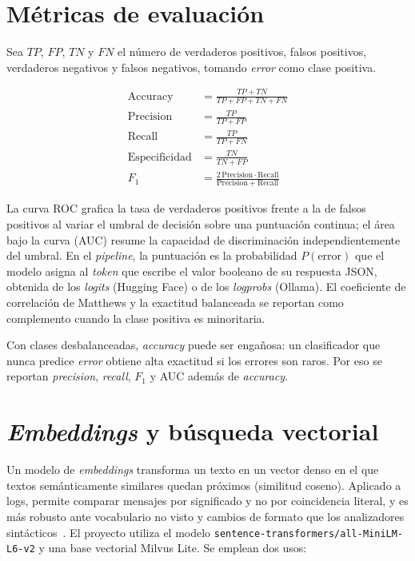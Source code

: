 \section{Métricas de evaluación}\label{sec:mt_metricas}

Sea $TP$, $FP$, $TN$ y $FN$ el número de verdaderos positivos, falsos positivos, verdaderos negativos y falsos negativos, tomando \emph{error} como clase positiva.

\begin{align}
\mathrm{Accuracy} &= \frac{TP + TN}{TP + FP + TN + FN}\\
\mathrm{Precision} &= \frac{TP}{TP + FP}\\
\mathrm{Recall} &= \frac{TP}{TP + FN}\\
\mathrm{Especificidad} &= \frac{TN}{TN + FP}\\
F_1 &= \frac{2\,\mathrm{Precision}\cdot\mathrm{Recall}}{\mathrm{Precision} + \mathrm{Recall}}
\end{align}

La curva ROC grafica la tasa de verdaderos positivos frente a la de falsos positivos al variar el umbral de decisión sobre una puntuación continua; el área bajo la curva (AUC) resume la capacidad de discriminación independientemente del umbral. En el \textit{pipeline}, la puntuación es la probabilidad $P(\text{error})$ que el modelo asigna al \textit{token} que escribe el valor booleano de su respuesta JSON, obtenida de los \textit{logits} (Hugging Face) o de los \textit{logprobs} (Ollama). El coeficiente de correlación de Matthews y la exactitud balanceada se reportan como complemento cuando la clase positiva es minoritaria.

Con clases desbalanceadas, \textit{accuracy} puede ser engañosa: un clasificador que nunca predice \emph{error} obtiene alta exactitud si los errores son raros. Por eso se reportan \textit{precision}, \textit{recall}, $F_1$ y AUC además de \textit{accuracy}.

\section{\textit{Embeddings} y búsqueda vectorial}\label{sec:mt_embeddings}

Un modelo de \textit{embeddings} transforma un texto en un vector denso en el que textos semánticamente similares quedan próximos (similitud coseno). Aplicado a logs, permite comparar mensajes por significado y no por coincidencia literal, y es más robusto ante vocabulario no visto y cambios de formato que los analizadores sintácticos~\cite{murphy2024_embeddings}. El proyecto utiliza el modelo \texttt{sentence-transformers/all-MiniLM-L6-v2} y una base vectorial Milvus Lite. Se emplean dos usos:

